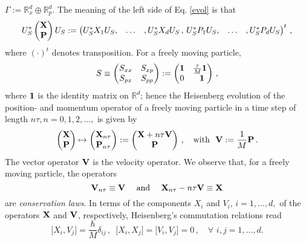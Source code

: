 \documentclass[12pt]{article}
\begin{document}
$\Gamma:=\mathbb{R}^{d}_{x} \oplus \mathbb{R}^{d}_{p}$. 
The meaning of the left side of Eq. \eqref{evol} is that 
$$U_{S}^{*} \begin{pmatrix}{\bf{X}}\\{\bf{P}}\end{pmatrix} U_{S} := 
\begin{pmatrix}U_{S}^{*}X_1 U_{S},&\dots&,U_{S}^{*}X_d U_{S}\,,\,U_{S}^{*}P_1 U_{S},&\dots&,U_{S}^{*}P_{d} U_{S}              \end{pmatrix}^{t}\,,$$  
where $(\cdot)^{t}$ denotes transposition. For a freely moving particle,
\begin{equation}
S\equiv \begin{pmatrix} S_{xx}&S_{xp}\\ S_{px}& S_{pp} \end{pmatrix} :=\begin{pmatrix} {\bf{1}} & \frac{\tau}{M} {\bf{1}}\\
0&\,\, \,{\bf{1}}\end{pmatrix}\,,
\end{equation}
where ${\bf{1}}$ is the identity matrix on $\mathbb{R}^{d}$; hence the Heisenberg evolution of the position- and momentum operator of a freely moving particle in a time step of length $n\tau, n=0, 1, 2, \dots,$ is given by
\begin{equation}\label{Heisenberg}
\begin{pmatrix}{\bf{X}}\\{\bf{P}}\end{pmatrix} \mapsto \begin{pmatrix}{\bf{X}}_{n\tau}\\ {\bf{P}}_{n\tau} \end{pmatrix} := 
\begin{pmatrix}{\bf{X}}+ n \tau {\bf{V}}\\{\bf{P}}\end{pmatrix}\,, \quad \text{with  }\,\, {\bf{V}}:= \frac{1}{M}{\bf{P}}\,.
\end{equation}
The vector operator ${\bf{V}}$ is the velocity operator. We observe that, for a freely moving particle, the operators
\begin{equation}\label{conserved}
{\bf{V}}_{n\tau} \equiv {\bf{V}} \quad \text{ and } \quad {\bf{X}}_{n\tau} - n\tau {\bf{V}}\equiv {\bf{X}}
\end{equation}
are \textit{conservation laws}.
In terms of the components $X_i$ and $V_i$, $i=1,\dots, d,$ of the operators ${\bf{X}}$ and ${\bf{V}}$, respectively, Heisenberg's commutation relations read
\begin{equation}\label{CCR}
\big[X_i, V_j\big]=  \frac{\hbar}{M} \delta_{ij}\,, \,\, \,\big[X_i, X_j\big]=\big[V_i, V_j\big]=0\,, \quad \forall\,\, i, j= 1,\dots, d.
\end{equation}
\end{document}
